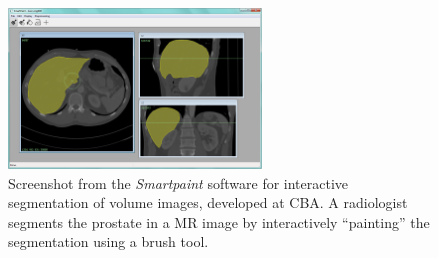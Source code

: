 \begin{enumerate}
\begin{figure}[!h]
\centering
\includegraphics[width=0.6\textwidth]{figures/research/SP_Screenshot.png}
\caption{\label{fig:smartpaint} Screenshot from the \emph{Smartpaint} software for interactive segmentation of volume images, developed at CBA. A radiologist segments the prostate in a MR image by interactively ``painting'' the segmentation using a brush tool.} 
\end{figure}



\end{enumerate}
